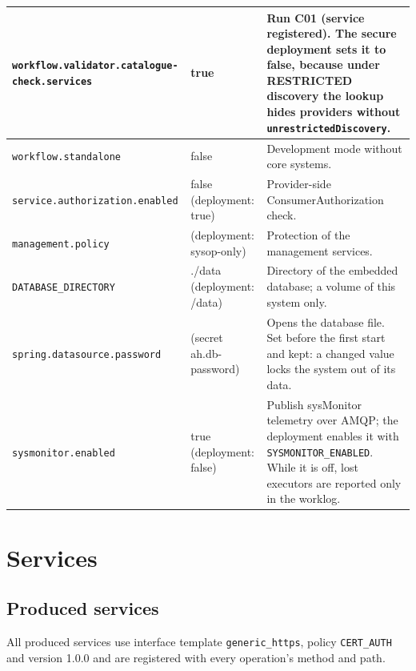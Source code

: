 \documentclass[a4paper]{arrowhead}
\begin{document}
{\begin{longtable}{|p{5.6cm}|p{3.4cm}|p{6.8cm}|}
\texttt{workflow.\allowbreak{}validator.\allowbreak{}catalogue-\allowbreak{}check.\allowbreak{}services} & true & Run C01 (service registered). The secure deployment sets it to false, because under RESTRICTED discovery the lookup hides providers without \texttt{unrestricted\allowbreak{}Discovery}. \\ \hline
\texttt{workflow.\allowbreak{}standalone} & false & Development mode without core systems. \\ \hline
\texttt{service.\allowbreak{}authorization.\allowbreak{}enabled} & false (deployment: true) & Provider-side ConsumerAuthorization check. \\ \hline
\texttt{management.\allowbreak{}policy} & (deployment: sysop-only) & Protection of the management services. \\ \hline
\texttt{DATABASE\_\allowbreak{}DIRECTORY} & ./data (deployment: /data) & Directory of the embedded database; a volume of this system only. \\ \hline
\texttt{spring.\allowbreak{}datasource.\allowbreak{}password} & (secret ah.db-password) & Opens the database file. Set before the first start and kept: a changed value locks the system out of its data. \\ \hline
\texttt{sysmonitor.\allowbreak{}enabled} & true (deployment: false) & Publish sysMonitor telemetry over AMQP; the deployment enables it with \texttt{SYSMONITOR\_\allowbreak{}ENABLED}. While it is off, lost executors are reported only in the worklog. \\ \hline
\end{longtable}
}


\newpage
\section{Services}
\label{sec:services}
\subsection{Produced services}
All produced services use interface template \texttt{generic\_\allowbreak{}https}, policy \texttt{CERT\_AUTH} and version 1.0.0 and are
registered with every operation's method and path.
\end{document}
